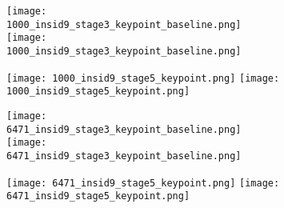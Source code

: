 \begin{figure}[H]
	\centering
	\begin{minipage}{\linewidth}
		\centering
		\begin{subfigure}[b]{0.45\linewidth}
			\centering
			\begin{minipage}{\linewidth}
				\texttt{[image: 1000\_insid9\_stage3\_keypoint\_baseline.png]}
				{\texttt{[image: 1000\_insid9\_stage3\_keypoint\_baseline.png]}}
			\end{minipage}
		\end{subfigure}
		\begin{subfigure}[b]{0.45\linewidth}
			\centering
			\begin{minipage}{\linewidth}
				\texttt{[image: 1000\_insid9\_stage5\_keypoint.png]}
				{\texttt{[image: 1000\_insid9\_stage5\_keypoint.png]}}
			\end{minipage}
		\end{subfigure}

		\vskip5pt
		\begin{subfigure}[b]{0.45\linewidth}
			\centering
			\begin{minipage}{\linewidth}
				\texttt{[image: 6471\_insid9\_stage3\_keypoint\_baseline.png]}
				{\texttt{[image: 6471\_insid9\_stage3\_keypoint\_baseline.png]}}
			\end{minipage}
		\end{subfigure}
		\begin{subfigure}[b]{0.45\linewidth}
			\centering
			\begin{minipage}{\linewidth}
				\texttt{[image: 6471\_insid9\_stage5\_keypoint.png]}
				{\texttt{[image: 6471\_insid9\_stage5\_keypoint.png]}}
			\end{minipage}
		\end{subfigure}


\end{minipage}
\end{figure}
